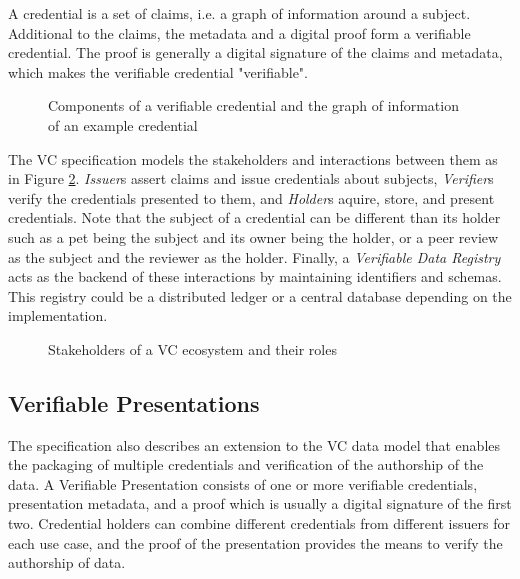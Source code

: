 A credential is a set of claims, i.e. a graph of information around a subject. Additional to the claims, the metadata and a digital proof form a verifiable credential. The proof is generally a digital signature of the claims and metadata, which makes the verifiable credential "verifiable".

\begin{figure}[htbp]
  \centering
  
  
  \caption{Components of a verifiable credential and the graph of information of an example credential \parencite{Sporny.18Kas2019}} \label{fig:credentialGraph}
\end{figure}

The \acrshort{VC} specification models the stakeholders and interactions between them as in Figure \ref{fig:ecosystem}. \textit{Issuer}s assert claims and issue credentials about subjects, \textit{Verifier}s verify the credentials presented to them, and \textit{Holder}s aquire, store, and present credentials. Note that the subject of a credential can be different than its holder such as a pet being the subject and its owner being the holder, or a peer review as the subject and the reviewer as the holder. Finally, a \textit{Verifiable Data Registry} acts as the backend of these interactions by maintaining identifiers and schemas. This registry could be a distributed ledger or a central database depending on the implementation.

\begin{figure}[htbp]
  \centering
  
  \caption{Stakeholders of a \acrlong{VC} ecosystem and their roles \parencite{Sporny.18Kas2019}} \label{fig:ecosystem}
\end{figure}

\subsection{Verifiable Presentations}

The specification also describes an extension to the \acrshort{VC} data model that enables the packaging of multiple credentials and verification of the authorship of the data. A Verifiable Presentation consists of one or more verifiable credentials, presentation metadata, and a proof which is usually a digital signature of the first two. Credential holders can combine different credentials from different issuers for each use case, and the proof of the presentation provides the means to verify the authorship of data.

